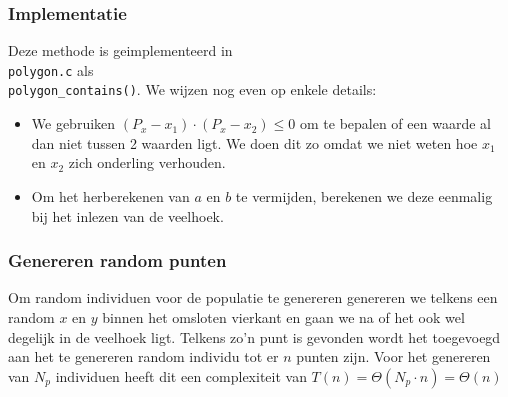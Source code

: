 \subsubsection{Implementatie}
Deze methode is geimplementeerd in \\ \texttt{polygon.c} als \\ \texttt{polygon\_contains()}. 
We wijzen nog even op enkele details:
\begin{itemize}
\item We gebruiken $(P_x-x_1)\cdot(P_x-x_2)\leq0$ om te bepalen of een waarde al dan niet 
		tussen 2 waarden ligt. We doen dit zo omdat we niet weten hoe $x_1$ en $x_2$ 
		zich onderling verhouden.
\item Om het herberekenen van $a$ en $b$ te vermijden, berekenen we deze eenmalig bij het inlezen van de veelhoek.
\end{itemize}

\subsubsection{Genereren random punten}
\label{ssub:rand_generation}
Om random individuen voor de populatie te genereren genereren we telkens een random $x$ en $y$ binnen het omsloten vierkant en gaan we na of het ook wel degelijk in de veelhoek ligt. Telkens zo'n punt is gevonden wordt het toegevoegd aan het te genereren random individu tot er $n$ punten zijn. Voor het genereren van $N_p$ individuen heeft dit een complexiteit van $T(n)=\Theta(N_p\cdot n) = \Theta(n)$


 
